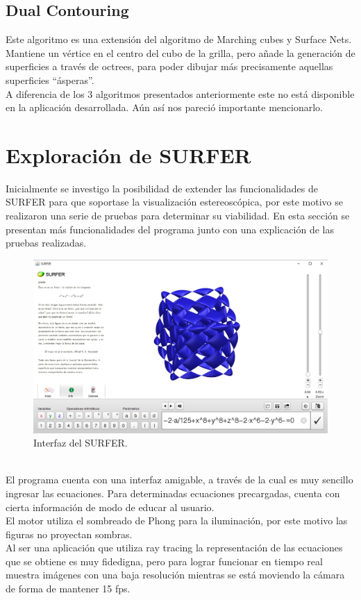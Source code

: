 \documentclass[12pt]{article}
\begin{document}
\subsection{Dual Contouring}
Este algoritmo es una extensión del algoritmo de Marching cubes y Surface Nets. Mantiene un vértice en el centro del cubo de la grilla, pero añade la generación de superficies a través de octrees, para poder dibujar más precisamente aquellas superficies “ásperas”. \\A diferencia de los 3 algoritmos presentados anteriormente este no está disponible en la aplicación desarrollada. Aún así nos pareció importante mencionarlo\cite{dualcontour}.
\clearpage
\section{Exploración de SURFER}
Inicialmente se investigo la posibilidad de extender las funcionalidades de SURFER para que soportase la visualización estereoscópica, por este motivo se realizaron una serie de pruebas para determinar su viabilidad. En esta sección se presentan más funcionalidades del programa junto con una explicación de las pruebas realizadas.
\begin{figure}[h]
\includegraphics[width=\textwidth]{surfer_interfaz.png}
\caption{Interfaz del SURFER.}
\end{figure}
\\El programa cuenta con una interfaz amigable, a través de la cual es muy sencillo ingresar las ecuaciones. Para determinadas ecuaciones precargadas, cuenta con cierta información de modo de educar al usuario.
\\El motor utiliza el sombreado de Phong\cite{Phong} para la iluminación, por este motivo las figuras no proyectan sombras.
\\Al ser una aplicación que utiliza ray tracing la representación de las ecuaciones que se obtiene es muy fidedigna, pero para lograr funcionar en tiempo real muestra imágenes con una baja resolución mientras se está moviendo la cámara de forma de mantener 15 fps.
\end{document}
